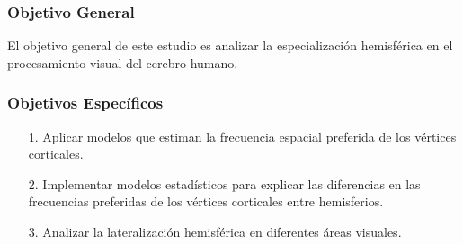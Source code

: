 \documentclass[
11pt, %
%
aspectratio=169, %
]{beamer}
\begin{document}
\begin{frame}
	\frametitle{Objetivo General}
	El objetivo general de este estudio es analizar la especializaci\'on hemisférica en el procesamiento visual del cerebro humano.
	
	
\end{frame}

\begin{frame}
	\frametitle{Objetivos Espec\'ificos}
	\begin{itemize}
		\item[1.]  Aplicar modelos que estiman la frecuencia espacial preferida de los v\'ertices corticales.
		
		\item[2.] Implementar modelos estadísticos para explicar las diferencias en las frecuencias preferidas de los v\'ertices corticales entre hemisferios.	
		
		\item[3.] Analizar la lateralización hemisférica en diferentes áreas visuales.
	\end{itemize}
	
	
\end{frame}
	
\end{document}
